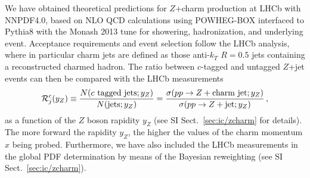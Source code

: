 \documentclass[11pt,a4paper]{article}
\def\frac#1#2{{{#1}\over {#2}}}
\begin{document}
We have obtained  theoretical predictions for $Z$+charm production
at LHCb with NNPDF4.0, based on
NLO QCD calculations using
{\sc\small POWHEG-BOX} 
interfaced to {\sc\small Pythia8}
with the Monash 2013 tune for showering,
hadronization, and underlying event.
%
Acceptance requirements and event selection follow the LHCb analysis,
where in particular charm jets are defined as those anti-$k_T$ $R=0.5$ jets
containing a reconstructed charmed hadron.
%
The ratio between $c$-tagged and untagged $Z$+jet events can then
be compared with the LHCb measurements
\begin{equation}
  \mathcal{R}_j^c(y_Z) \equiv \frac{N(c~{\rm tagged~jets};y_Z)}{ 
    N({\rm jets};y_Z)} =
  \frac{\sigma(pp\to Z+{\rm charm~ jet};y_Z)}{\sigma(pp \to Z+{\rm jet};y_Z)} \, ,
\end{equation}
as a function of the $Z$ boson rapidity $y_Z$ (see SI Sect.~\ref{sec:ic/zcharm} for details).
%
The more forward the rapidity $ y_{Z}$, the higher the values
of the charm momentum $x$ being probed.
%
Furthermore, we have also included  the LHCb measurements in the global PDF determination  
by means of the 
Bayesian reweighting (see SI Sect.~\ref{sec:ic/zcharm}).

\clearpage


\end{document}
